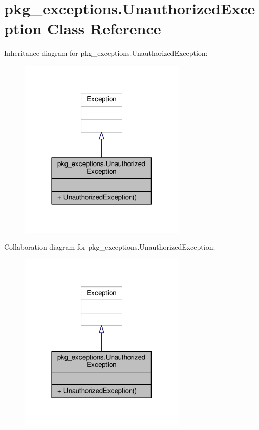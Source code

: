 \hypertarget{classpkg__exceptions_1_1UnauthorizedException}{\section{pkg\-\_\-exceptions.\-Unauthorized\-Exception Class Reference}
\label{classpkg__exceptions_1_1UnauthorizedException}
}


Inheritance diagram for pkg\-\_\-exceptions.\-Unauthorized\-Exception\-:
\nopagebreak
\begin{figure}[H]
\begin{center}
\leavevmode
\includegraphics[width=226pt]{classpkg__exceptions_1_1UnauthorizedException__inherit__graph}
\end{center}
\end{figure}


Collaboration diagram for pkg\-\_\-exceptions.\-Unauthorized\-Exception\-:
\nopagebreak
\begin{figure}[H]
\begin{center}
\leavevmode
\includegraphics[width=226pt]{classpkg__exceptions_1_1UnauthorizedException__coll__graph}
\end{center}
\end{figure}
